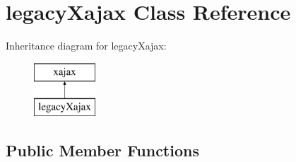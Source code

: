 \hypertarget{classlegacyXajax}{
\section{legacyXajax Class Reference}
\label{classlegacyXajax}
}
Inheritance diagram for legacyXajax:\begin{figure}[H]
\begin{center}
\leavevmode
\includegraphics[height=2.000000cm]{classlegacyXajax}
\end{center}
\end{figure}
\subsection*{Public Member Functions}
